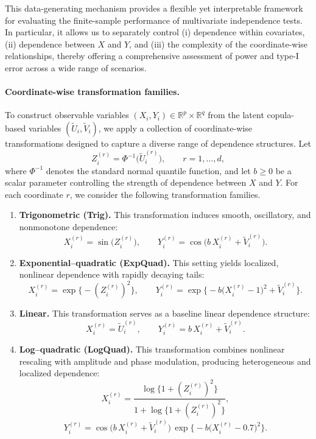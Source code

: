 \documentclass[12pt,reqno,oneside]{amsbook}
\theoremstyle{definition}
\theoremstyle{remark}
\begin{document}
This data-generating mechanism provides a flexible yet interpretable framework
for evaluating the finite-sample performance of multivariate independence
tests. In particular, it allows us to separately control (i) dependence within
covariates, (ii) dependence between $X$ and $Y$, and (iii) the complexity of the
coordinate-wise relationships, thereby offering a comprehensive assessment of
power and type-I error across a wide range of scenarios.

\paragraph{Coordinate-wise transformation families.}
To construct observable variables $(X_i,Y_i)\in\mathbb{R}^p\times\mathbb{R}^q$
from the latent copula-based variables $(\tilde U_i,\tilde V_i)$, we apply a
collection of coordinate-wise transformations designed to capture a diverse
range of dependence structures. Let
\[
Z_i^{(r)} = \Phi^{-1}\!\bigl(\tilde U_i^{(r)}\bigr),
\qquad r=1,\ldots,d,
\]
where $\Phi^{-1}$ denotes the standard normal quantile function, and let $b\ge0$
be a scalar parameter controlling the strength of dependence between $X$ and
$Y$. For each coordinate $r$, we consider the following transformation families.

\begin{enumerate}
\item \textbf{Trigonometric (Trig).}
This transformation induces smooth, oscillatory, and nonmonotone dependence:
\[
X_i^{(r)} = \sin\!\bigl(Z_i^{(r)}\bigr),
\qquad
Y_i^{(r)} = \cos\!\bigl(b\,X_i^{(r)} + \tilde V_i^{(r)}\bigr).
\]

\item \textbf{Exponential--quadratic (ExpQuad).}
This setting yields localized, nonlinear dependence with rapidly decaying
tails:
\[
X_i^{(r)} = \exp\!\bigl\{-(Z_i^{(r)})^2\bigr\},
\qquad
Y_i^{(r)} = \exp\!\bigl\{-b\bigl(X_i^{(r)}-1\bigr)^2 + \tilde V_i^{(r)}\bigr\}.
\]

\item \textbf{Linear.}
This transformation serves as a baseline linear dependence structure:
\[
X_i^{(r)} = \tilde U_i^{(r)},
\qquad
Y_i^{(r)} = b\,X_i^{(r)} + \tilde V_i^{(r)}.
\]

\item \textbf{Log--quadratic (LogQuad).}
This transformation combines nonlinear rescaling with amplitude and phase
modulation, producing heterogeneous and localized dependence:
\[
X_i^{(r)}
=
\frac{\log\!\bigl\{1+(Z_i^{(r)})^2\bigr\}}
     {1+\log\!\bigl\{1+(Z_i^{(r)})^2\bigr\}},
\]
\[
Y_i^{(r)}
=
\cos\!\bigl(b\,X_i^{(r)} + \tilde V_i^{(r)}\bigr)\,
\exp\!\bigl\{-b\bigl(X_i^{(r)}-0.7\bigr)^2\bigr\}.
\]
\end{enumerate}
\end{document}
